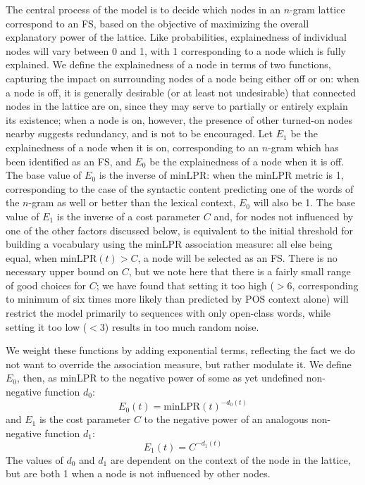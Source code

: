 \documentclass[11pt,letterpaper]{article}
\newcommand{\minLPR}{\ensuremath{\text{minLPR}}}
\begin{document}
The central process of the model is to decide which nodes in an $n$-gram lattice correspond to an FS, based on the objective of maximizing the overall explanatory power of the lattice. Like probabilities, explainedness of individual nodes will vary between 0 and 1, with 1 corresponding to a node which is fully explained. We define the explainedness of a node in terms of two functions, capturing the impact on surrounding nodes of a node being either off or on: when a node is off, it is generally desirable (or at least not undesirable) that connected nodes in the lattice are on, since they may serve to partially or entirely explain its existence; when a node is on, however, the presence of other turned-on nodes nearby suggests redundancy, and is not to be encouraged. Let $E_{1}$ be the explainedness of a node when it is on, corresponding to an $n$-gram which has been identified as an FS, and $E_{0}$ be the explainedness of a node when it is off. The base value of $E_{0}$ is the inverse of minLPR: when the minLPR metric is 1, corresponding to the case of the syntactic content predicting one of the words of the $n$-gram as well or better than the lexical context, $E_{0}$  will also be 1. The base value of $E_{1}$ is the inverse of a cost parameter $C$ and, for nodes not influenced by one of the other factors discussed below, is equivalent to the initial threshold for building a vocabulary using the minLPR association measure: all else being equal, when $\minLPR(t) > C$, a node will be selected as an FS. There is no necessary upper bound on $C$, but we note here that there is a fairly small range of good choices for $C$; we have found that setting it too high ($>6$, corresponding to minimum of six times more likely than predicted by POS context alone) will restrict the model primarily to sequences with only open-class words, while setting it too low ($<3$) results in too much random noise.


We weight these functions by adding exponential terms, reflecting the fact we do not want to override the association measure, but rather modulate it. We define $E_0$, then, as minLPR to the negative power of some as yet undefined non-negative function $d_0$:
\begin{displaymath}
E_0(t) = \minLPR(t)^{-d_0(t)}
\end{displaymath}
and $E_1$ is the cost parameter $C$ to the negative power of an analogous non-negative function $d_1$:
\begin{displaymath}
E_1(t) = C^{-d_1(t)}
\end{displaymath}
The values of $d_0$ and $d_1$ are dependent on the context of the node in the lattice, but are both 1 when a node is not influenced by other nodes.
\end{document}
